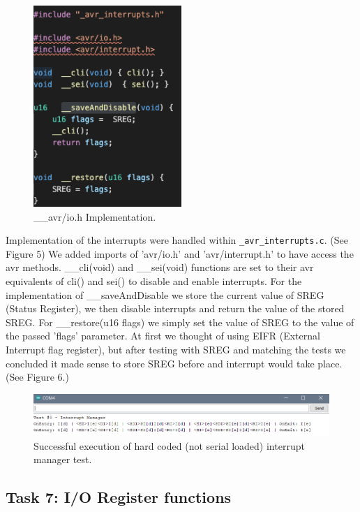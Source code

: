 \documentclass[11pt]{article}
\begin{document}
\begin{figure}[h!]
    \centering
    \includegraphics[height=3in]{report/Interman_Implementation.png}
    \caption{\_\_avr/io.h Implementation.}
\end{figure}
Implementation of the interrupts were handled within \lstinline[columns=fixed]{_avr_interrupts.c}. (See Figure 5)
We added imports of 'avr/io.h' and 'avr/interrupt.h' to have access the avr methods. \_\_cli(void) and \_\_sei(void) functions are set to their avr equivalents of cli() and sei() to disable and enable interrupts. For the implementation of \_\_saveAndDisable we store the current value of SREG (Status Register), we then disable interrupts and return the value of the stored SREG. For \_\_restore(u16 flags) we simply set the value of SREG to the value of the passed 'flags' parameter. At first we thought of using EIFR (External Interrupt flag register), but after testing with SREG and matching the tests we concluded it made sense to store SREG before and interrupt would take place. (See Figure 6.)

\begin{figure}[h!]
    \includegraphics[width=\textwidth]{report/working_interman_test.PNG}
    \caption{Successful execution of hard coded (not serial loaded) interrupt manager test.}
\end{figure}

\subsection{Task 7: I/O Register functions}
\end{document}
